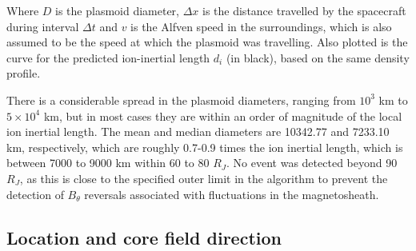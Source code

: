 Where $D$ is the plasmoid diameter, $\Delta x$ is the distance travelled by the spacecraft during interval $\Delta t$ and $v$ is the Alfven speed in the surroundings, which is also assumed to be the speed at which the plasmoid was travelling.  Also plotted is the curve for the predicted ion-inertial length $d_i$ (in black), based on the same density profile. 

There is a considerable spread in the plasmoid diameters, ranging from $10^3$ km to $5 \times 10^4$ km, but in most cases they are within an order of magnitude of the local ion inertial length. The mean and median diameters are 10342.77 and 7233.10 km, respectively, which are roughly 0.7-0.9 times the ion inertial length, which is between 7000 to 9000 km within 60 to 80 $R_J$. No event was detected beyond 90 $R_J$, as this is close to the specified outer limit in the algorithm to prevent the detection of $B_\theta$ reversals associated with fluctuations in the magnetosheath. 

\subsection{Location and core field direction}

